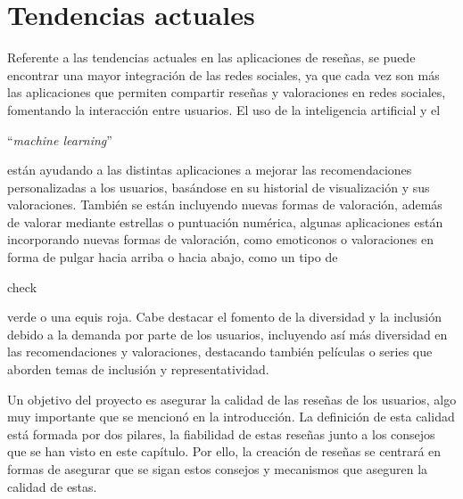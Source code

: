 \section{Tendencias actuales}

Referente a las tendencias actuales en las aplicaciones de reseñas, se puede encontrar una mayor integración de las redes sociales, ya que cada vez son más las aplicaciones que permiten compartir reseñas y valoraciones en redes sociales, fomentando la interacción entre usuarios. El uso de la inteligencia artificial\cite{ReviewsfAI} y el \begin{otherlanguage}{english}``\textit{machine learning}''\end{otherlanguage} \cite{MachLear} están ayudando a las distintas aplicaciones a mejorar\cite{ReviewsML} las recomendaciones personalizadas a los usuarios, basándose en su historial de visualización y sus valoraciones. También se están incluyendo nuevas formas de valoración, además de valorar mediante estrellas o puntuación numérica, algunas aplicaciones están incorporando nuevas formas de valoración, como emoticonos o valoraciones en forma de pulgar hacia arriba o hacia abajo, como un tipo de \begin{otherlanguage}{english}check \end{otherlanguage} verde o una equis roja. Cabe destacar el fomento de la diversidad y la inclusión debido a la demanda por parte de los usuarios, incluyendo así más diversidad en las recomendaciones y valoraciones, destacando también películas o series que aborden temas de inclusión y representatividad.

Un objetivo del proyecto es asegurar la calidad de las reseñas de los usuarios, algo muy importante que se mencionó en la introducción. La definición de esta calidad está formada por dos pilares, la fiabilidad de estas reseñas junto a los consejos que se han visto en este capítulo. Por ello, la creación de reseñas se centrará en formas de asegurar que se sigan estos consejos y mecanismos que aseguren la calidad de estas.  




